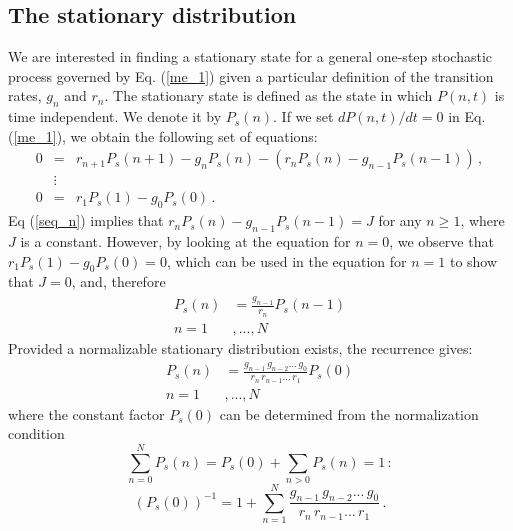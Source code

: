 \subsection{The stationary distribution}
\label{stationary_distribution}
We are interested in finding a stationary state for a general one-step stochastic process governed by Eq. (\ref{me_1}) given a particular definition of the transition rates, $g_n$ and $r_n$. The stationary state is defined as the state in which $P(n, t)$ is time independent. We denote it by $P_s(n)$. If we set $dP(n,t)/dt=0$ in Eq. (\ref{me_1}), we obtain the following set of equations:
\begin{eqnarray}
\label{seq_n}
0 & = & r_{n+1} P_s(n+1) - g_n P_s(n) - (r_n P_s(n) - g_{n-1} P_s(n-1))\,, \\
&\vdots& \nonumber\\
\label{seq_0}
0 & = & r_{1} P_s(1) - g_0 P_s(0)\,.
\end{eqnarray}
Eq (\ref{seq_n}) implies that $r_n P_s(n) - g_{n-1} P_s(n-1) = J$ for any $n \ge 1$, where $J$ is a constant. However, by looking at the equation for $n=0$, we observe that $r_{1} P_s(1) - g_0 P_s(0) = 0$, which can be used in the equation for $n=1$ to show that $J = 0$, and, therefore 
\begin{align}
P_s(n) &= \frac{g_{n-1}}{r_n} P_s(n-1)\nonumber\\
   n =1&,...,N     
\label{balance}
\end{align}
Provided a normalizable stationary distribution exists, the recurrence gives: 
\begin{align}
P_s(n)      &= \frac{g_{n-1}\, g_{n-2} ...\, g_0}{r_n\, r_{n-1} ...\, r_1} P_s(0)\nonumber\\
        n =1&,...,N    
\label{P_stationary}
\end{align}
where the constant factor $P_s(0)$ can be determined from the normalization condition
\begin{equation}
\sum_{n=0}^N P_s(n) = P_s(0) + \sum_{n>0} P_s(n) = 1\, :
\label{Norma}
\end{equation}
\begin{equation}
(P_s(0))^{-1} = 1 + \sum_{n=1}^{N} \frac{g_{n-1}\, g_{n-2} ...\, g_0}{r_n\, 
	r_{n-1} ...\, r_1}\, .  
\label{inversionPs(0)}
\end{equation}

